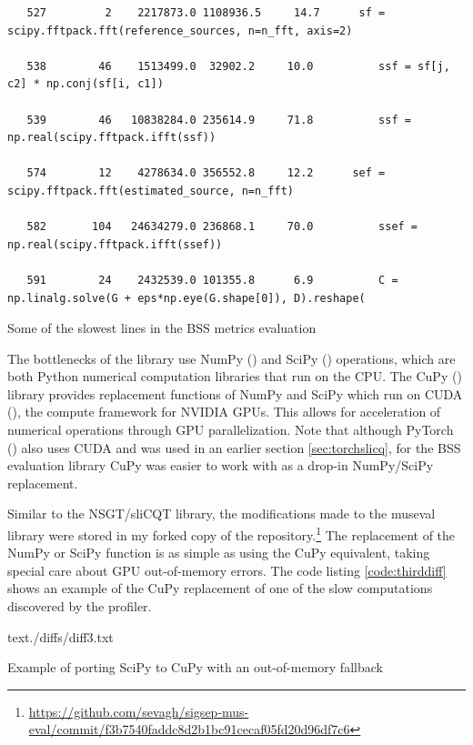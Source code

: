 \documentclass[report.tex]{subfiles}
\begin{document}
\begin{listing}[h]
  \centering
\begin{verbatim}
   527         2    2217873.0 1108936.5     14.7      sf = scipy.fftpack.fft(reference_sources, n=n_fft, axis=2)

   538        46    1513499.0  32902.2     10.0          ssf = sf[j, c2] * np.conj(sf[i, c1])

   539        46   10838284.0 235614.9     71.8          ssf = np.real(scipy.fftpack.ifft(ssf))

   574        12    4278634.0 356552.8     12.2      sef = scipy.fftpack.fft(estimated_source, n=n_fft)

   582       104   24634279.0 236868.1     70.0          ssef = np.real(scipy.fftpack.ifft(ssef))

   591        24    2432539.0 101355.8      6.9          C = np.linalg.solve(G + eps*np.eye(G.shape[0]), D).reshape(
\end{verbatim}
  \caption{Some of the slowest lines in the BSS metrics evaluation}
  \label{lst:slowbssprofile}
\end{listing}

The bottlenecks of the library use NumPy (\cite{numpy}) and SciPy (\cite{scipy}) operations, which are both Python numerical computation libraries that run on the CPU. The CuPy (\cite{cupy}) library provides replacement functions of NumPy and SciPy which run on CUDA (\cite{cuda}), the compute framework for NVIDIA GPUs. This allows for acceleration of numerical operations through GPU parallelization. Note that although PyTorch (\cite{pytorch}) also uses CUDA and was used in an earlier section \ref{sec:torchslicq}, for the BSS evaluation library CuPy was easier to work with as a drop-in NumPy/SciPy replacement.

Similar to the NSGT/sliCQT library, the modifications made to the museval library were stored in my forked copy of the repository.\footnote{\url{https://github.com/sevagh/sigsep-mus-eval/commit/f3b7540faddc8d2b1bc91cecaf05fd20d96df7c6}} The replacement of the NumPy or SciPy function is as simple as using the CuPy equivalent, taking special care about GPU out-of-memory errors. The code listing \ref{code:thirddiff} shows an example of the CuPy replacement of one of the slow computations discovered by the profiler.

\begin{listing}[ht]
  \centering
\begin{inputminted}[linenos,breaklines,frame=single,fontsize=\scriptsize]{text}{./diffs/diff3.txt}
\end{inputminted}
  \caption{Example of porting SciPy to CuPy with an out-of-memory fallback}
  \label{code:thirddiff}
\end{listing}
\end{document}
